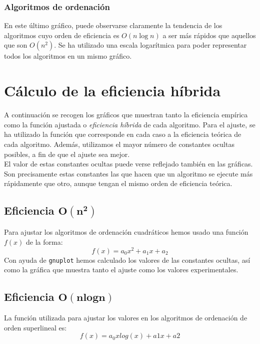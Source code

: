 \documentclass[11pt]{article}
\begin{document}
\subsubsection*{Algoritmos de ordenación}

\vspace{1em}

En este último gráfico, puede observarse claramente la tendencia de los algoritmos cuyo orden de eficiencia es $O(n\log n)$ a ser más rápidos que aquellos que son $O(n^2)$. Se ha utilizado una escala logarítmica para poder representar todos los algoritmos en un mismo gráfico.

\newpage


\section*{Cálculo de la eficiencia híbrida}
A continuación se recogen los gráficos que muestran tanto la eficiencia empírica como la función ajustada o \textit{eficiencia híbrida} de cada algoritmo. Para el ajuste, se ha utilizado la función que corresponde en cada caso a la eficiencia teórica de cada algoritmo. Además, utilizamos el mayor número de constantes ocultas posibles, a fin de que el ajuste sea mejor.\\

El valor de estas constantes ocultas puede verse reflejado también en las gráficas. Son precisamente estas constantes las que hacen que un algoritmo se ejecute más rápidamente que otro, aunque tengan el mismo orden de eficiencia teórica. 



\subsection*{Eficiencia $\boldsymbol{O(n^2)}$}

Para ajustar los algoritmos de ordenación cuadráticos hemos usado una función $f(x)$ de la forma: $$f(x) = a_0x^2 + a_1x + a_2$$ Con ayuda de \verb|gnuplot| hemos calculado los valores de las constantes ocultas, así como la gráfica que muestra tanto el ajuste como los valores experimentales.


\newpage
\subsection*{Eficiencia $\boldsymbol{O(n log n)}$}

La función utilizada para ajustar los valores en los algoritmos de ordenación de orden superlineal es: $$f(x) = a_0xlog(x) + a1x + a2$$
\end{document}

